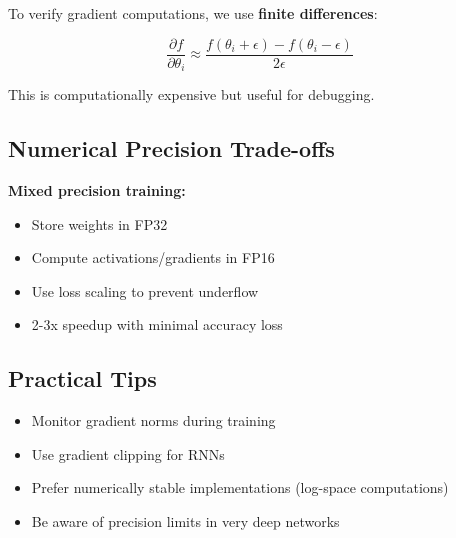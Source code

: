 To verify gradient computations, we use \textbf{finite differences}:

\begin{equation}
\frac{\partial f}{\partial \theta_i} \approx \frac{f(\theta_i + \epsilon) - f(\theta_i - \epsilon)}{2\epsilon}
\end{equation}

This is computationally expensive but useful for debugging.

\subsection{Numerical Precision Trade-offs}

\textbf{Mixed precision training:}
\begin{itemize}
    \item Store weights in FP32
    \item Compute activations/gradients in FP16
    \item Use loss scaling to prevent underflow
    \item 2-3x speedup with minimal accuracy loss
\end{itemize}

\subsection{Practical Tips}

\begin{itemize}
    \item Monitor gradient norms during training
    \item Use gradient clipping for RNNs
    \item Prefer numerically stable implementations (log-space computations)
    \item Be aware of precision limits in very deep networks
\end{itemize}
